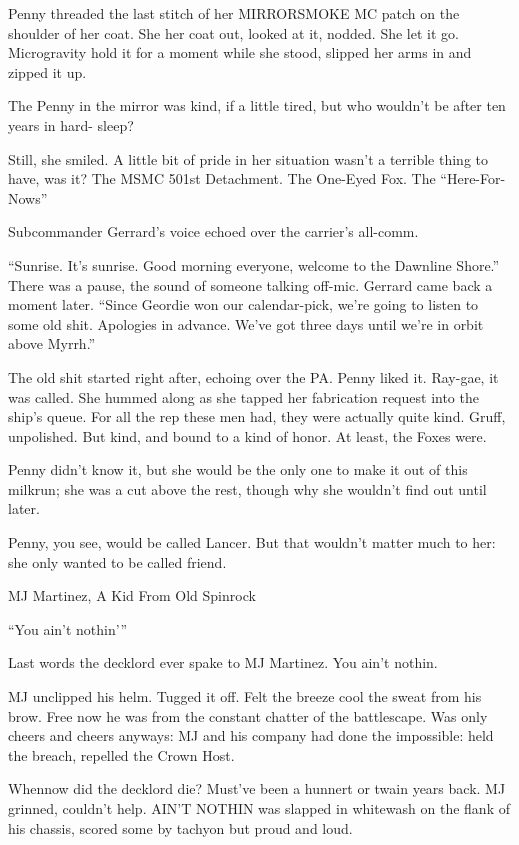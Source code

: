 Penny threaded the last stitch of her MIRRORSMOKE MC patch on the shoulder of her coat. She
her coat out, looked at it, nodded. She let it go. Microgravity hold it for a moment while she stood,
slipped her arms in and zipped it up.




The Penny in the mirror was kind, if a little tired, but who wouldn’t be after ten years in hard-
sleep?

Still, she smiled. A little bit of pride in her situation wasn’t a terrible thing to have, was it? The
MSMC 501st Detachment. The One-Eyed Fox. The “Here-For-Nows”

Subcommander Gerrard’s voice echoed over the carrier’s all-comm.

“Sunrise. It’s sunrise. Good morning everyone, welcome to the Dawnline Shore.” There was a
pause, the sound of someone talking off-mic. Gerrard came back a moment later. “Since Geordie
won our calendar-pick, we’re going to listen to some old shit. Apologies in advance. We’ve got
three days until we’re in orbit above Myrrh.”

The old shit started right after, echoing over the PA. Penny liked it. Ray-gae, it was called. She
hummed along as she tapped her fabrication request into the ship’s queue. For all the rep these
men had, they were actually quite kind. Gruff, unpolished. But kind, and bound to a kind of honor.
At least, the Foxes were.

Penny didn’t know it, but she would be the only one to make it out of this milkrun; she was a cut
above the rest, though why she wouldn’t find out until later.

Penny, you see, would be called Lancer. But that wouldn’t matter much to her: she only wanted to
be called friend.

MJ Martinez, A Kid From Old Spinrock

“You ain’t nothin’”

Last words the decklord ever spake to MJ Martinez. You ain’t nothin.

MJ unclipped his helm. Tugged it off. Felt the breeze cool the sweat from his brow. Free now he
was from the constant chatter of the battlescape. Was only cheers and cheers anyways: MJ and
his company had done the impossible: held the breach, repelled the Crown Host.

Whennow did the decklord die? Must’ve been a hunnert or twain years back. MJ grinned, couldn’t
help. AIN’T NOTHIN was slapped in whitewash on the flank of his chassis, scored some by
tachyon but proud and loud.

